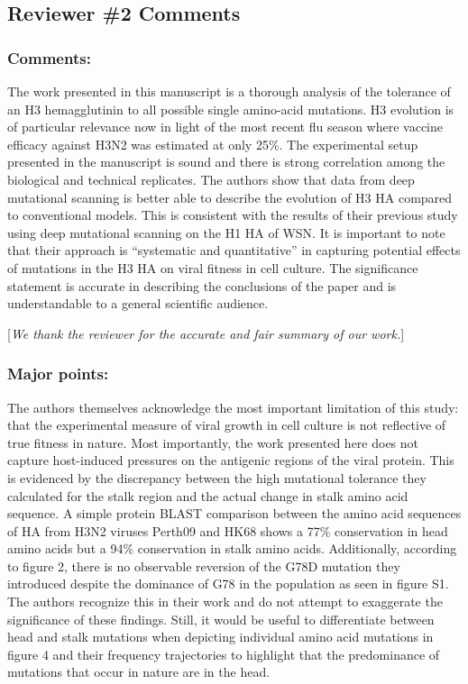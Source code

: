 \documentclass[11pt, oneside]{article}   	%
\newcommand{\comment}[1]{{\color{red}[\textsl{#1}]}}
\begin{document}
\subsection*{Reviewer \#2 Comments} 

\subsubsection*{Comments:} 
The work presented in this manuscript is a thorough analysis of the tolerance of an H3 hemagglutinin to all possible single amino-acid mutations. H3 evolution is of particular relevance now in light of the most recent flu season where vaccine efficacy against H3N2 was estimated at only 25\%. The experimental setup presented in the manuscript is sound and there is strong correlation among the biological and technical replicates. The authors show that data from deep mutational scanning is better able to describe the evolution of H3 HA compared to conventional models. This is consistent with the results of their previous study using deep mutational scanning on the H1 HA of WSN. It is important to note that their approach is ``systematic and quantitative'' in capturing potential effects of mutations in the H3 HA on viral fitness in cell culture. The significance statement is accurate in describing the conclusions of the paper and is understandable to a general scientific audience. 

\comment{We thank the reviewer for the accurate and fair summary of our work.}

\subsubsection*{Major points:} 

The authors themselves acknowledge the most important limitation of this study: that the experimental measure of viral growth in cell culture is not reflective of true fitness in nature. Most importantly, the work presented here does not capture host-induced pressures on the antigenic regions of the viral protein. This is evidenced by the discrepancy between the high mutational tolerance they calculated for the stalk region and the actual change in stalk amino acid sequence. A simple protein BLAST comparison between the amino acid sequences of HA from H3N2 viruses Perth09 and HK68 shows a 77\% conservation in head amino acids but a 94\% conservation in stalk amino acids. Additionally, according to figure 2, there is no observable reversion of the G78D mutation they introduced despite the dominance of G78 in the population as seen in figure S1. The authors recognize this in their work and do not attempt to exaggerate the significance of these findings. Still, it would be useful to differentiate between head and stalk mutations when depicting individual amino acid mutations in figure 4 and their frequency trajectories to highlight that the predominance of mutations that occur in nature are in the head. 
\end{document}
